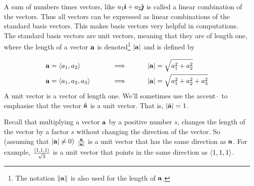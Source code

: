 A sum of numbers times vectors, like $a_1\hat{\pmb{\imath}}+a_2\hat{\pmb{\jmath}}$ is called
a linear combination of the vectors.
Thus all vectors can be expressed as linear combinations of the standard
basis vectors. This makes basis vectors very helpful in computations.
The  standard basis vectors are unit vectors, meaning that they are of 
length one, where the length of a vector $\mathbf{a}$ is denoted\footnote{The notation $\|\mathbf{a}\|$ is also used for the length of $\mathbf{a}$.} $|\mathbf{a}|$ 
and is defined by
\begin{defn}\label{def:vectLen}
\begin{alignat*}{5}
&\mathbf{a}=\left< a_1,a_2\right> \qquad&&\implies\qquad &&|\mathbf{a}|=\sqrt{a_1^2+a_2^2}\\
&\mathbf{a}=\left< a_1,a_2,a_3\right> \qquad&&\implies\qquad &&|\mathbf{a}|=\sqrt{a_1^2+a_2^2+a_3^2}
\end{alignat*}
A unit vector is a vector of length one. We'll sometimes use the accent 
$\hat{\ }$ to emphasise that the vector $\hat{\mathbf{a}}$ is a unit vector.
That is, $|\hat{\mathbf{a}}|=1$.
\end{defn}


\begin{eg}\label{eg unit vector}
Recall that multiplying a vector $\mathbf{a}$ by a positive number $s$,
changes the length of the vector by a factor $s$ without changing
the direction of the vector. So (assuming that $|\mathbf{a}|\ne 0)$
$\frac{\mathbf{a}}{|\mathbf{a}|}$ is a unit vector that has the same direction as
$\mathbf{a}$. For example, $\frac{\left< 1,1,1\right>}{\sqrt{3}}$ is a unit vector
that points in the same direction as $\left< 1,1,1\right>$.
\end{eg}
\goodbreak

